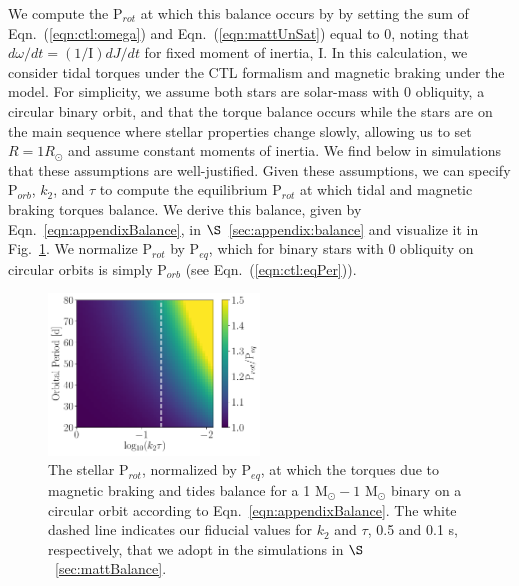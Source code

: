 \documentclass[twocolumn]{aastex61}
\begin{document}
We compute the P$_{rot}$ at which this balance occurs by by setting the sum of Eqn.~(\ref{eqn:ctl:omega}) and Eqn.~(\ref{eqn:mattUnSat}) equal to 0, noting that $d\omega/dt = (1/\mathrm{I}) dJ/dt$ for fixed moment of inertia, I.  In this calculation, we consider tidal torques under the CTL formalism and magnetic braking under the \citet{Matt2015} model. For simplicity, we assume both stars are solar-mass with 0 obliquity, a circular binary orbit, and that the torque balance occurs while the stars are on the main sequence where stellar properties change slowly, allowing us to set $R = 1 R_{\odot}$ and assume constant moments of inertia. We find below in simulations that these assumptions are well-justified. Given these assumptions, we can specify P$_{orb}$, $k_2$, and $\tau$ to compute the equilibrium P$_{rot}$ at which tidal and magnetic braking torques balance.  We derive this balance, given by Eqn.~\ref{eqn:appendixBalance}, in $\S$~\ref{sec:appendix:balance} and visualize it in Fig.~\ref{fig:analyticBalance}. We normalize P$_{rot}$ by P$_{eq}$, which for binary stars with 0 obliquity on circular orbits is simply P$_{orb}$ (see Eqn.~(\ref{eqn:ctl:eqPer})).

\begin{figure}[h]
	\includegraphics[width=0.5\textwidth]{../Plots/analyticTorque.pdf}
   \caption{The stellar P$_{rot}$, normalized by P$_{eq}$, at which the torques due to magnetic braking and tides balance for a 1 M$_{\odot} - 1$ M$_{\odot}$ binary on a circular orbit according to Eqn.~\ref{eqn:appendixBalance}. The white dashed line indicates our fiducial values for $k_2$ and $\tau$, 0.5 and 0.1 s, respectively, that we adopt in the simulations in $\S$~\ref{sec:mattBalance}.}%
    \label{fig:analyticBalance}%
\end{figure}
\end{document}
